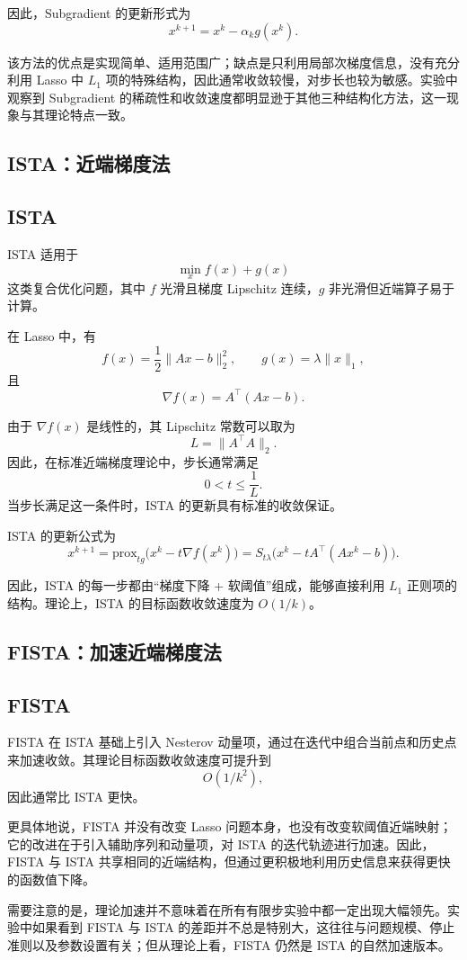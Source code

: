 \documentclass[12pt,a4paper]{ctexart}
\begin{document}
因此，Subgradient 的更新形式为
\[
x^{k+1}=x^k-\alpha_k g(x^k).
\]

该方法的优点是实现简单、适用范围广；缺点是只利用局部次梯度信息，没有充分利用 Lasso 中 $L_1$ 项的特殊结构，因此通常收敛较慢，对步长也较为敏感。实验中观察到 Subgradient 的稀疏性和收敛速度都明显逊于其他三种结构化方法，这一现象与其理论特点一致。

\subsection{ISTA：近端梯度法}
\subsection{ISTA}
ISTA 适用于
\[
\min_x f(x)+g(x)
\]
这类复合优化问题，其中 $f$ 光滑且梯度 Lipschitz 连续，$g$ 非光滑但近端算子易于计算。

在 Lasso 中，有
\[
f(x)=\frac{1}{2}\|Ax-b\|_2^2,\qquad
g(x)=\lambda\|x\|_1,
\]
且
\[
\nabla f(x)=A^\top(Ax-b).
\]

由于 $\nabla f(x)$ 是线性的，其 Lipschitz 常数可以取为
\[
L=\|A^\top A\|_2.
\]
因此，在标准近端梯度理论中，步长通常满足
\[
0<t\le \frac{1}{L}.
\]
当步长满足这一条件时，ISTA 的更新具有标准的收敛保证。

ISTA 的更新公式为
\[
x^{k+1}
=
\mathrm{prox}_{t g}\bigl(x^k-t\nabla f(x^k)\bigr)
=
S_{t\lambda}\bigl(x^k-tA^\top(Ax^k-b)\bigr).
\]

因此，ISTA 的每一步都由“梯度下降 + 软阈值”组成，能够直接利用 $L_1$ 正则项的结构。理论上，ISTA 的目标函数收敛速度为 $O(1/k)$。

\subsection{FISTA：加速近端梯度法}
\subsection{FISTA}
FISTA 在 ISTA 基础上引入 Nesterov 动量项，通过在迭代中组合当前点和历史点来加速收敛。其理论目标函数收敛速度可提升到
\[
O(1/k^2),
\]
因此通常比 ISTA 更快。

更具体地说，FISTA 并没有改变 Lasso 问题本身，也没有改变软阈值近端映射；它的改进在于引入辅助序列和动量项，对 ISTA 的迭代轨迹进行加速。因此，FISTA 与 ISTA 共享相同的近端结构，但通过更积极地利用历史信息来获得更快的函数值下降。

需要注意的是，理论加速并不意味着在所有有限步实验中都一定出现大幅领先。实验中如果看到 FISTA 与 ISTA 的差距并不总是特别大，这往往与问题规模、停止准则以及参数设置有关；但从理论上看，FISTA 仍然是 ISTA 的自然加速版本。
\end{document}
